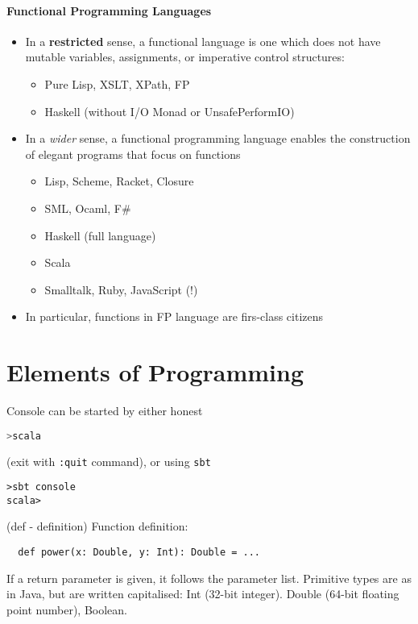 \documentclass{scrartcl}
\begin{document}
\paragraph{Functional Programming Languages}
\begin{itemize}
\item In a {\bf restricted} sense, a functional language is one which does not
  have mutable variables, assignments, or imperative control structures:
  \begin{itemize}
  \item Pure Lisp, XSLT, XPath, FP
  \item Haskell (without I/O Monad or UnsafePerformIO)
  \end{itemize}
\item In a {\it wider} sense, a functional programming language enables the
  construction of elegant programs that focus on functions
  \begin{itemize}
  \item Lisp, Scheme, Racket, Closure
  \item SML, Ocaml, F\#
  \item Haskell (full language)
  \item Scala
  \item Smalltalk, Ruby, JavaScript (!)
  \end{itemize}
\item In particular, functions in FP language are firs-class citizens
\end{itemize}


\section{Elements of Programming}
\label{sec:Elements}

Console can be started by either honest
\begin{lstlisting}[language=scala, caption=={Plugin function }]
>scala
\end{lstlisting}

(exit with \verb!:quit! command), or using \verb!sbt!

\begin{lstlisting}
>sbt console
scala>
\end{lstlisting}
(def - definition) Function definition:
\begin{lstlisting}
  def power(x: Double, y: Int): Double = ...
\end{lstlisting}
If a return parameter is given, it follows the parameter list. Primitive types
are as in Java, but are written capitalised: Int (32-bit integer). Double
(64-bit floating point number), Boolean.
\end{document}
